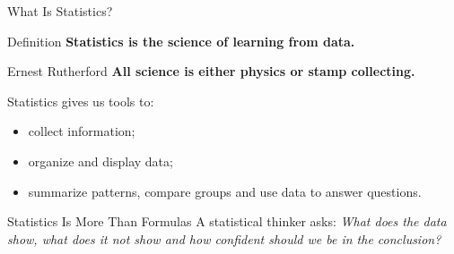 \documentclass[aspectratio=169]{beamer}
\begin{document}

\begin{frame}{What Is Statistics?}
  \begin{block}{Definition}
    \textbf{Statistics is the science of learning from data.}
  \end{block}
  \begin{block}{Ernest Rutherford}
    \textbf{All science is either physics or stamp collecting.}
  \end{block}
  \vspace{0.15cm}
  Statistics gives us tools to:
  \begin{itemize}
    \item collect information;
    \item organize and display data;
    \item summarize patterns, compare groups and use data to answer questions.
  \end{itemize}
  \vspace{0.15cm}
  \begin{alertblock}{Statistics Is More Than Formulas}
    A statistical thinker asks: \emph{What does the data show, what does it not show and how confident should we be in the conclusion?}
  \end{alertblock}
\end{frame}
\end{document}
